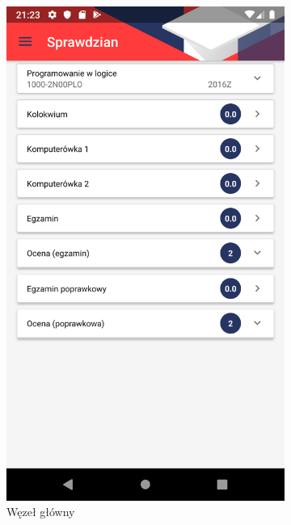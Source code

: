\documentclass{pracamgr}
\begin{document}
\begin{figure}[p]
	\quad
	\begin{subfigure}[t]{0.3\textwidth}
		\includegraphics[width=\textwidth]{img/tests_root.png}
		\caption{Węzeł główny}
		\label{fig:tests_root}
	\end{subfigure}
	\quad
	\begin{subfigure}[t]{0.3\textwidth}

\end{subfigure}
\end{figure}
\end{document}

